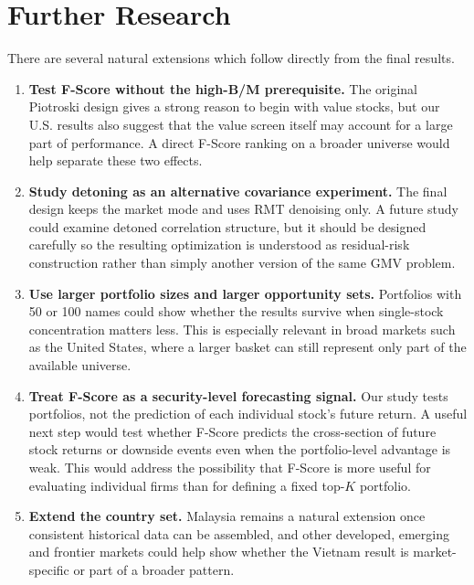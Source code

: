 \documentclass[11pt,a4paper]{report}
\numberwithin{figure}{chapter}
\numberwithin{table}{chapter}
\numberwithin{equation}{chapter}
\begin{document}
\section{Further Research}
\label{sec:future_work}

There are several natural extensions which follow directly from the final results.

\begin{enumerate}
    \item \textbf{Test F-Score without the high-B/M prerequisite.} The original Piotroski design gives a strong reason to begin with value stocks, but our U.S. results also suggest that the value screen itself may account for a large part of performance. A direct F-Score ranking on a broader universe would help separate these two effects.

    \item \textbf{Study detoning as an alternative covariance experiment.} The final design keeps the market mode and uses RMT denoising only. A future study could examine detoned correlation structure, but it should be designed carefully so the resulting optimization is understood as residual-risk construction rather than simply another version of the same GMV problem.

    \item \textbf{Use larger portfolio sizes and larger opportunity sets.} Portfolios with 50 or 100 names could show whether the results survive when single-stock concentration matters less. This is especially relevant in broad markets such as the United States, where a larger basket can still represent only part of the available universe.

    \item \textbf{Treat F-Score as a security-level forecasting signal.} Our study tests portfolios, not the prediction of each individual stock's future return. A useful next step would test whether F-Score predicts the cross-section of future stock returns or downside events even when the portfolio-level advantage is weak. This would address the possibility that F-Score is more useful for evaluating individual firms than for defining a fixed top-$K$ portfolio.

    \item \textbf{Extend the country set.} Malaysia remains a natural extension once consistent historical data can be assembled, and other developed, emerging and frontier markets could help show whether the Vietnam result is market-specific or part of a broader pattern.


\end{enumerate}
\end{document}
